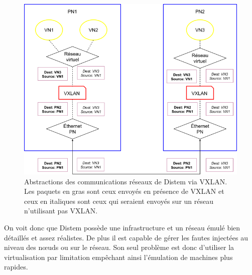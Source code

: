 \begin{figure}[H]
  \centering
  \includegraphics[scale=0.45]{Pictures/png/Distem_VXLAN}
  \caption{Abstractions des communications réseaux de Distem via VXLAN. Les paquets en gras sont ceux envoyés en présence de VXLAN et ceux en italiques sont ceux qui seraient envoyés sur un réseau n'utilisant pas VXLAN.}
  \label{Distem_VXLAN}
\end{figure}

On voit donc que Distem possède une infrastructure et un réseau émulé bien
détaillés et assez réalistes. De plus il est capable de gérer les fautes
injectées au niveau des n\oe uds ou sur le réseau. Son seul problème est donc d'utiliser la virtualisation par limitation empêchant ainsi l'émulation de machines plus rapides.
